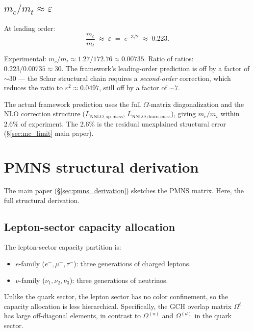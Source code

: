 \documentclass[11pt]{article}
\theoremstyle{definition}
\begin{document}
\subsection{\texorpdfstring{$m_c / m_t \approx \varepsilon$}{mc/mt = epsilon}}\label{sec:mc_mt_ratio}

At leading order:
\[
\frac{m_c}{m_t} \;\approx\; \varepsilon \;=\; e^{-3/2} \;\approx\; 0.223.
\]

Experimental: $m_c / m_t \approx 1.27 / 172.76 \approx 0.00735$. Ratio of ratios: $0.223 / 0.00735 \approx 30$. The framework's leading-order prediction is off by a factor of $\sim 30$ --- the Schur structural chain requires a \emph{second-order} correction, which reduces the ratio to $\varepsilon^2 \approx 0.0497$, still off by a factor of $\sim 7$.

The actual framework prediction uses the full $\Omega$-matrix diagonalization and the NLO correction structure ($L_{\mathrm{NNLO\_up\_mass}}$, $L_{\mathrm{NNLO\_down\_mass}}$), giving $m_c / m_t$ within $2.6\%$ of experiment. The 2.6\% is the residual unexplained structural error (\S\ref{sec:mc_limit} main paper).

\clearpage

\section{PMNS structural derivation}\label{sec:PMNS_full}

The main paper (\S\ref{sec:pmns_derivation}) sketches the PMNS matrix. Here, the full structural derivation.

\subsection{Lepton-sector capacity allocation}\label{sec:lepton_capacity}

The lepton-sector capacity partition is:
\begin{itemize}
    \item $e$-family ($e^-, \mu^-, \tau^-$): three generations of charged leptons.
    \item $\nu$-family ($\nu_1, \nu_2, \nu_3$): three generations of neutrinos.
\end{itemize}

Unlike the quark sector, the lepton sector has no color confinement, so the capacity allocation is less hierarchical. Specifically, the GCH overlap matrix $\Omega^{\ell}$ has large off-diagonal elements, in contrast to $\Omega^{(u)}$ and $\Omega^{(d)}$ in the quark sector.
\end{document}
